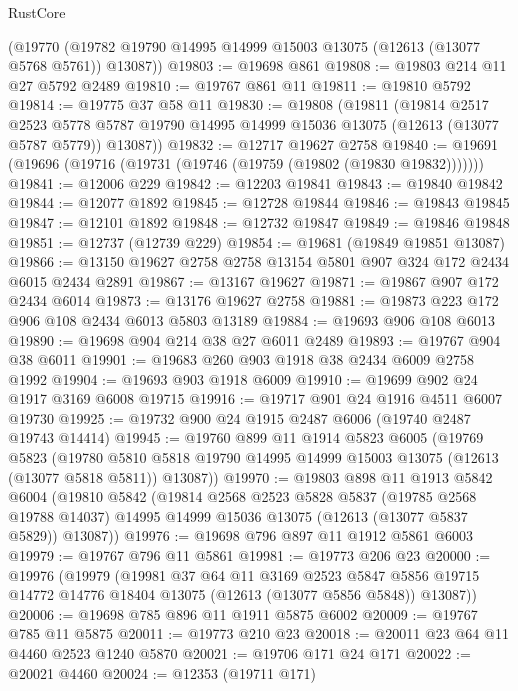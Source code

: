 \begin{lexlean}{RustCore}
\begin{coremodule}
    (@19770 (@19782 @19790 @14995 @14999 @15003 @13075 (@12613 (@13077 @5768 @5761)) @13087))
@19803 := @19698 @861
@19808 := @19803 @214 @11 @27 @5792 @2489
@19810 := @19767 @861 @11
@19811 := @19810 @5792
@19814 := @19775 @37 @58 @11
@19830 := @19808
    (@19811
      (@19814
        @2517
        @2523
        @5778
        @5787
        @19790
        @14995
        @14999
        @15036
        @13075
        (@12613 (@13077 @5787 @5779))
        @13087))
@19832 := @12717 @19627 @2758
@19840 := @19691 (@19696 (@19716 (@19731 (@19746 (@19759 (@19802 (@19830 @19832)))))))
@19841 := @12006 @229
@19842 := @12203 @19841
@19843 := @19840 @19842
@19844 := @12077 @1892
@19845 := @12728 @19844
@19846 := @19843 @19845
@19847 := @12101 @1892
@19848 := @12732 @19847
@19849 := @19846 @19848
@19851 := @12737 (@12739 @229)
@19854 := @19681 (@19849 @19851 @13087)
@19866 := @13150 @19627 @2758 @2758 @13154 @5801 @907 @324 @172 @2434 @6015 @2434 @2891
@19867 := @13167 @19627
@19871 := @19867 @907 @172 @2434 @6014
@19873 := @13176 @19627 @2758
@19881 := @19873 @223 @172 @906 @108 @2434 @6013 @5803 @13189
@19884 := @19693 @906 @108 @6013
@19890 := @19698 @904 @214 @38 @27 @6011 @2489
@19893 := @19767 @904 @38 @6011
@19901 := @19683 @260 @903 @1918 @38 @2434 @6009 @2758 @1992
@19904 := @19693 @903 @1918 @6009
@19910 := @19699 @902 @24 @1917 @3169 @6008 @19715
@19916 := @19717 @901 @24 @1916 @4511 @6007 @19730
@19925 := @19732 @900 @24 @1915 @2487 @6006 (@19740 @2487 @19743 @14414)
@19945 := @19760
    @899
    @11
    @1914
    @5823
    @6005
    (@19769
      @5823
      (@19780 @5810 @5818 @19790 @14995 @14999 @15003 @13075 (@12613 (@13077 @5818 @5811)) @13087))
@19970 := @19803
    @898
    @11
    @1913
    @5842
    @6004
    (@19810
      @5842
      (@19814
        @2568
        @2523
        @5828
        @5837
        (@19785 @2568 @19788 @14037)
        @14995
        @14999
        @15036
        @13075
        (@12613 (@13077 @5837 @5829))
        @13087))
@19976 := @19698 @796 @897 @11 @1912 @5861 @6003
@19979 := @19767 @796 @11 @5861
@19981 := @19773 @206 @23
@20000 := @19976
    (@19979
      (@19981
        @37
        @64
        @11
        @3169
        @2523
        @5847
        @5856
        @19715
        @14772
        @14776
        @18404
        @13075
        (@12613 (@13077 @5856 @5848))
        @13087))
@20006 := @19698 @785 @896 @11 @1911 @5875 @6002
@20009 := @19767 @785 @11 @5875
@20011 := @19773 @210 @23
@20018 := @20011 @23 @64 @11 @4460 @2523 @1240 @5870
@20021 := @19706 @171 @24 @171
@20022 := @20021 @4460
@20024 := @12353 (@19711 @171)

\end{coremodule}
\end{lexlean}
